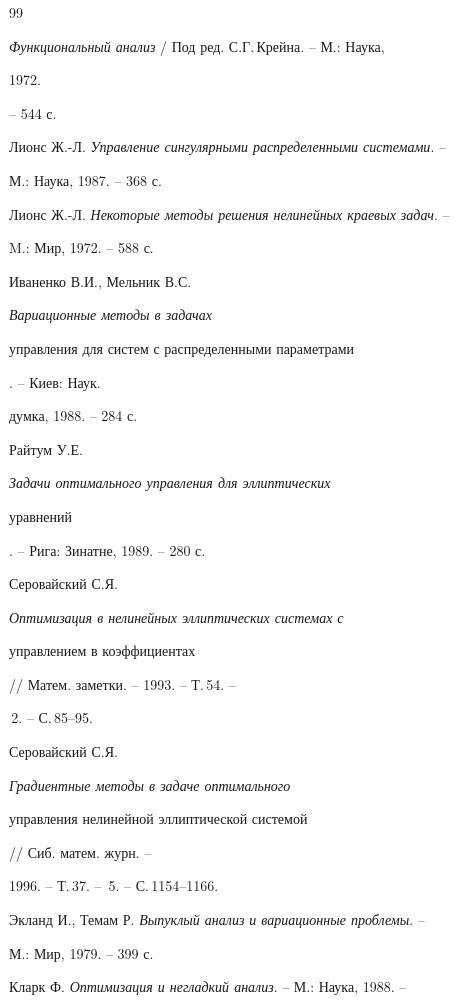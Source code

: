\begin{thebibliography}{99} 


 




{\em Функциональный анализ} / Под ред. С.Г.\,Крейна. -- М.: Наука, 


1972. 


-- 544 с. 




Лионс Ж.-Л. {\em Управление сингулярными распределенными системами}. -- 


М.: Наука, 1987. -- 368 с. 




Лионс Ж.-Л. {\em Некоторые методы решения нелинейных краевых задач}. -- 


M.: Мир, 1972. -- 588 с. 




Иваненко В.И., Мельник В.С. {\em Вариационные методы в задачах 


управления для систем с распределенными параметрами}. -- Киев: Наук. 


думка, 1988. -- 284 с. 




Райтум У.Е. {\em Задачи оптимального управления для эллиптических 


уравнений}. -- Рига: Зинатне, 1989. -- 280 с. 




Серовайский С.Я. {\em Оптимизация в нелинейных эллиптических системах с 


управлением в коэффициентах} // Матем. заметки. -- 1993. -- Т.\,54. -- 


\No\,2. -- С.\,85--95. 




Серовайский С.Я. {\em Градиентные методы в задаче оптимального 


управления нелинейной эллиптической системой} // Сиб. матем. журн. -- 


1996. -- Т.\,37. -- \No\,5. -- С.\,1154--1166. 




Экланд И., Темам Р. {\em Выпуклый анализ и вариационные проблемы}. -- 


М.: Мир, 1979. -- 399 с. 




Кларк Ф. {\em Оптимизация и негладкий анализ}. -- М.: Наука, 1988. -- 



\end{thebibliography}

